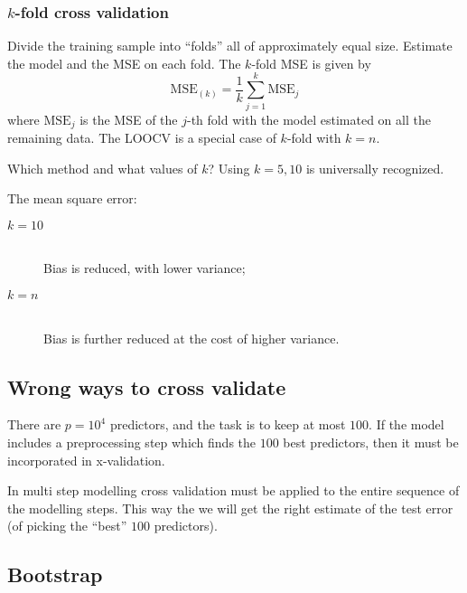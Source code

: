 \documentclass[a4paper]{article}
\begin{document}

\subsubsection{$k$-fold cross validation} %
\label{ssub:_k_fold_cross_validation}

Divide the training sample into ``folds'' all of approximately equal size. Estimate the model and the MSE on each fold. The $k$-fold MSE is given by 
\[\text{MSE}_{(k)} = \frac{1}{k}\sum_{j=1}^k \text{MSE}_j \]
where $\text{MSE}_j$ is the MSE of the $j$-th fold with the model estimated on all the remaining data. The LOOCV is a special case of $k$-fold with $k=n$.

Which method and what values of $k$? Using $k=5,10$ is universally recognized.

The mean square error:
\begin{description}
	\item[$k=10$] \hfill\\
		Bias is reduced, with lower variance;
	\item[$k=n$] \hfill\\
		Bias is further reduced at the cost of higher variance.
\end{description}


\subsection{Wrong ways to cross validate} %
\label{sub:wrong_ways_to_cross_validate}

There are $p=10^4$ predictors, and the task is to keep at most $100$. If the model includes a preprocessing step which finds the $100$ best predictors, then it must be incorporated in x-validation.

In multi step modelling cross validation must be applied to the entire sequence of the modelling steps. This way the we will get the right estimate of the test error (of picking the ``best'' $100$ predictors).



\subsection{Bootstrap} %
\label{sub:bootstrap}
\end{document}
